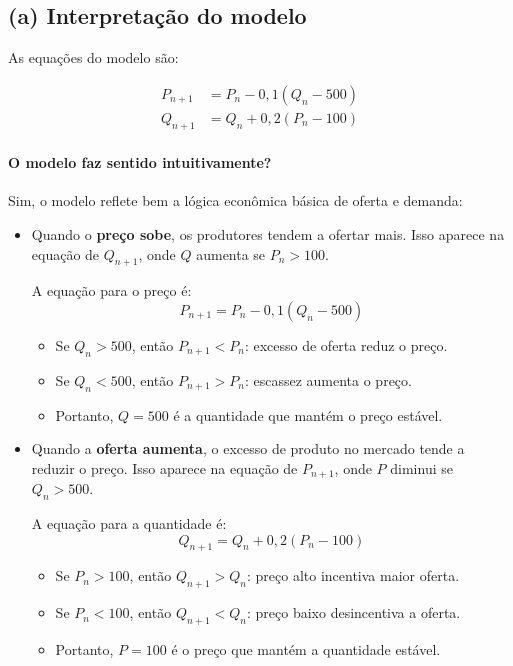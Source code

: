 \documentclass{article}
\begin{document}
\subsection*{(a) Interpretação do modelo}

As equações do modelo são:

\[
\begin{aligned}
P_{n+1} &= P_n - 0{,}1(Q_n - 500) \\
Q_{n+1} &= Q_n + 0{,}2(P_n - 100)
\end{aligned}
\]

\paragraph{O modelo faz sentido intuitivamente?}

Sim, o modelo reflete bem a lógica econômica básica de oferta e demanda:

\begin{itemize}
\item Quando o \textbf{preço sobe}, os produtores tendem a ofertar
  mais. Isso aparece na equação de $Q_{n+1}$, onde $Q$ aumenta se
  $P_n > 100$.

  A equação para o preço é:
  \[
    P_{n+1} = P_n - 0{,}1(Q_n - 500)
  \]
  \begin{itemize}
  \item Se $Q_n > 500$, então $P_{n+1} < P_n$: excesso de oferta reduz
    o preço.
  \item Se $Q_n < 500$, então $P_{n+1} > P_n$: escassez aumenta o
    preço.
  \item Portanto, $Q = 500$ é a quantidade que mantém o preço estável.
  \end{itemize}

  
\item Quando a \textbf{oferta aumenta}, o excesso de produto no mercado
  tende a reduzir o preço. Isso aparece na equação de $P_{n+1}$, onde
  $P$ diminui se $Q_n > 500$.

  A equação para a quantidade é:
  \[
    Q_{n+1} = Q_n + 0{,}2(P_n - 100)
  \]
  \begin{itemize}
  \item Se $P_n > 100$, então $Q_{n+1} > Q_n$: preço alto incentiva
    maior oferta.
  \item Se $P_n < 100$, então $Q_{n+1} < Q_n$: preço baixo desincentiva
    a oferta.
  \item Portanto, $P = 100$ é o preço que mantém a quantidade estável.
\end{itemize}
\end{itemize}
\end{document}
